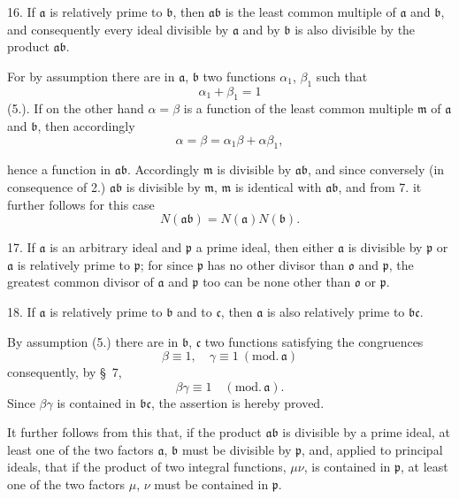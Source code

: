 \documentclass{article}
\begin{document}
16. If $\mathfrak{a}$ is relatively prime to $\mathfrak{b}$, then $\mathfrak{a}\mathfrak{b}$ is the least common multiple of $\mathfrak{a}$ and $\mathfrak{b}$, and consequently every ideal divisible by $\mathfrak{a}$ and by $\mathfrak{b}$ is also divisible by the product $\mathfrak{a}\mathfrak{b}$.

For by assumption there are in $\mathfrak{a}$, $\mathfrak{b}$ two functions $\alpha_{1}$, $\beta_{1}$ such that
\[ \alpha_{1} + \beta_{1} = 1 \]
(5.). If on the other hand $\alpha = \beta$ is a function of the least common multiple $\mathfrak{m}$ of $\mathfrak{a}$ and $\mathfrak{b}$, then accordingly
\[ \alpha = \beta = \alpha_{1}\beta + \alpha\beta_{1}, \]

hence a function in $\mathfrak{a}\mathfrak{b}$. Accordingly $\mathfrak{m}$ is divisible by $\mathfrak{a}\mathfrak{b}$, and since conversely (in consequence of 2.) $\mathfrak{a}\mathfrak{b}$ is divisible by $\mathfrak{m}$, $\mathfrak{m}$ is identical with $\mathfrak{a}\mathfrak{b}$, and from 7. it further follows for this case
\[ N(\mathfrak{a}\mathfrak{b}) = N(\mathfrak{a})N(\mathfrak{b}). \]

17. If $\mathfrak{a}$ is an arbitrary ideal and $\mathfrak{p}$ a prime ideal, then either $\mathfrak{a}$ is divisible by $\mathfrak{p}$ or $\mathfrak{a}$ is relatively prime to $\mathfrak{p}$; for since $\mathfrak{p}$ has no other divisor than $\mathfrak{o}$ and $\mathfrak{p}$, the greatest common divisor of $\mathfrak{a}$ and $\mathfrak{p}$ too can be none other than $\mathfrak{o}$ or $\mathfrak{p}$.

18. If $\mathfrak{a}$ is relatively prime to $\mathfrak{b}$ and to $\mathfrak{c}$, then $\mathfrak{a}$ is also relatively prime to $\mathfrak{b}\mathfrak{c}$.

By assumption (5.) there are in $\mathfrak{b}$, $\mathfrak{c}$ two functions satisfying the congruences
\[ \beta \equiv 1, \quad \gamma \equiv 1 \ (\text{mod.}\,\mathfrak{a}) \]
consequently, by §~7,
\[ \beta\gamma \equiv 1 \quad (\text{mod.}\,\mathfrak{a}). \]
Since $\beta\gamma$ is contained in $\mathfrak{b}\mathfrak{c}$, the assertion is hereby proved.

It further follows from this that, if the product $\mathfrak{a}\mathfrak{b}$ is divisible by a prime ideal, at least one of the two factors $\mathfrak{a}$, $\mathfrak{b}$ must be divisible by $\mathfrak{p}$, and, applied to principal ideals, that if the product of two integral functions, $\mu\nu$, is contained in $\mathfrak{p}$, at least one of the two factors $\mu$, $\nu$ must be contained in $\mathfrak{p}$.
\end{document}
